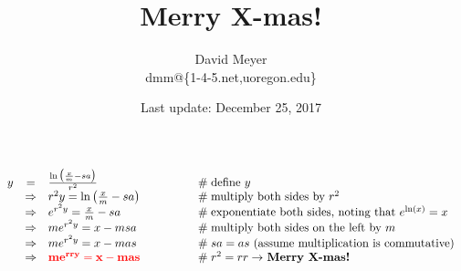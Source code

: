 \documentclass[11pt, oneside]{article}   	%
\title{Merry X-mas!}
\author{David Meyer \\ dmm@\{1-4-5.net,uoregon.edu\}}
\date{Last update: December 25, 2017}							%
\theoremstyle{definition}
\begin{document}
\maketitle


\begin{equation*}
\begin{array}{rcll} 
y
&=& \frac{\ln \big (\frac{x}{m} -  sa  \big ) }{r^2}                                        &\qquad \qquad \mathrel{\#} \text{define $y$}                                                                   \\
&\Rightarrow& r^2 y                          = \ln \big (\frac{x}{m} -  sa  \big )    &\qquad \qquad  \mathrel{\#} \text{multiply both sides by $r^2$}                                       \\
&\Rightarrow& e^{r^2y}                     = \frac{x}{m} -  sa                           &\qquad \qquad \mathrel{\#} \text{exponentiate both sides, noting that $e^{\ln(x)} = x$}  \\
&\Rightarrow& m e^{r^2y}                 = x - msa                                        &\qquad \qquad \mathrel{\#} \text{multiply both sides on the left by $m$}                         \\
&\Rightarrow& m e^{r^2y}                 = x - mas                                        &\qquad \qquad \mathrel{\#} \text{$sa = as$ (assume multiplication is commutative)}      \\
&\Rightarrow& \bf{\color{red}{m e^{rry}  = x - mas}}                                &\qquad \qquad \mathrel{\#} \text{$r^2 = rr \rightarrow$ \bf{Merry X-mas!}}
\end{array}
\end{equation*}
\end{document}
